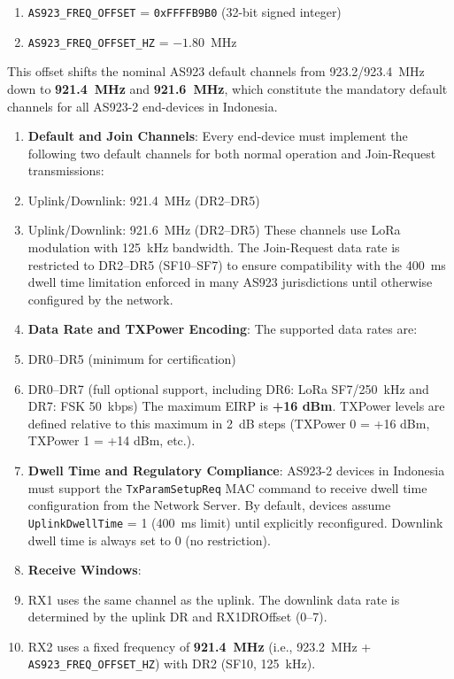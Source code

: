 \begin{enumerate}
    \item \texttt{AS923\_FREQ\_OFFSET} = \texttt{0xFFFFB9B0} (32-bit signed integer)
    \item \texttt{AS923\_FREQ\_OFFSET\_HZ} = $-1.80$~MHz
\end{enumerate}

This offset shifts the nominal AS923 default channels from 923.2/923.4~MHz down to \textbf{921.4~MHz} and \textbf{921.6~MHz}, which constitute the mandatory default channels for all AS923-2 end-devices in Indonesia.

\begin{enumerate}
    \item \textbf{Default and Join Channels}:
          Every end-device must implement the following two default channels for both normal operation and Join-Request transmissions:
    \item Uplink/Downlink: 921.4~MHz (DR2–DR5)
    \item Uplink/Downlink: 921.6~MHz (DR2–DR5)
          These channels use LoRa modulation with 125~kHz bandwidth. The Join-Request data rate is restricted to DR2–DR5 (SF10–SF7) to ensure compatibility with the 400~ms dwell time limitation enforced in many AS923 jurisdictions until otherwise configured by the network.

    \item \textbf{Data Rate and TXPower Encoding}:
          The supported data rates are:
    \item DR0–DR5 (minimum for certification)
    \item DR0–DR7 (full optional support, including DR6: LoRa SF7/250~kHz and DR7: FSK 50~kbps)
          The maximum EIRP is \textbf{+16 dBm}. TXPower levels are defined relative to this maximum in 2~dB steps (TXPower 0 = +16 dBm, TXPower 1 = +14 dBm, etc.).

    \item \textbf{Dwell Time and Regulatory Compliance}:
          AS923-2 devices in Indonesia must support the \texttt{TxParamSetupReq} MAC command to receive dwell time configuration from the Network Server. By default, devices assume \texttt{UplinkDwellTime} = 1 (400~ms limit) until explicitly reconfigured. Downlink dwell time is always set to 0 (no restriction).

    \item \textbf{Receive Windows}:
    \item RX1 uses the same channel as the uplink. The downlink data rate is determined by the uplink DR and RX1DROffset (0–7).
    \item RX2 uses a fixed frequency of \textbf{921.4~MHz} (i.e., 923.2~MHz + \texttt{AS923\_FREQ\_OFFSET\_HZ}) with DR2 (SF10, 125~kHz).


\end{enumerate}
